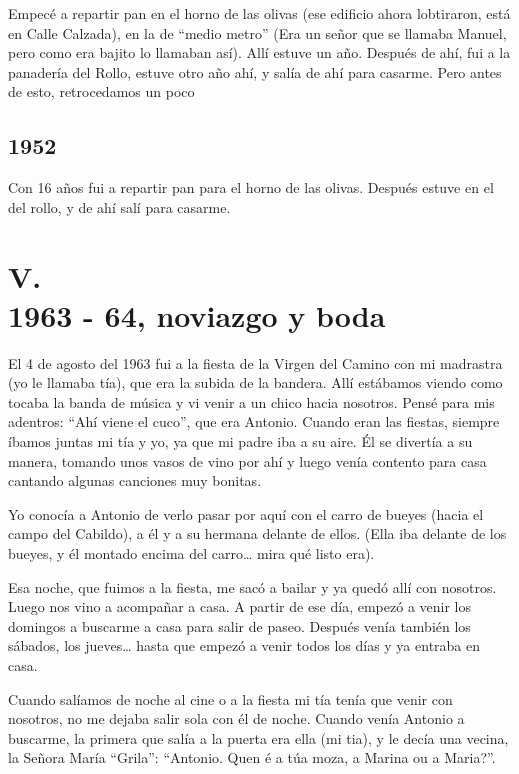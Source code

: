 \documentclass[12pt,a5paper]{book}
\begin{document}
Empecé a repartir pan en el horno de las olivas (ese edificio ahora lobtiraron, está en Calle Calzada), en la de “medio metro” (Era un señor que se llamaba Manuel, pero como era bajito lo llamaban así). Allí estuve un año. Después de ahí, fui a la panadería del Rollo, estuve otro año ahí, y salía de ahí para casarme. Pero antes de esto, retrocedamos un poco



\subsection*{1952}

Con 16 años fui a repartir pan para el horno de las olivas. Después estuve en el del rollo, y de ahí salí para casarme.



\section*{V.\\1963 - 64, noviazgo y boda}


El 4 de agosto del 1963 fui a la fiesta de la Virgen del Camino con mi madrastra (yo le llamaba tía), que era la subida de la bandera. Allí estábamos viendo como tocaba la banda de música y vi venir a un chico hacia nosotros. Pensé para mis adentros: “Ahí viene el cuco”, que era Antonio.
Cuando eran las fiestas, siempre íbamos juntas mi tía y yo, ya que mi padre iba a su aire. Él se divertía a su manera, tomando unos vasos de vino por ahí y luego venía contento para casa cantando algunas canciones muy bonitas.

Yo conocía a Antonio de verlo pasar por aquí con el carro de bueyes (hacia el campo del Cabildo), a él y a su hermana delante de ellos. (Ella iba delante de los bueyes, y él montado encima del carro… mira qué listo era).

Esa noche, que fuimos a la fiesta, me sacó a bailar y ya quedó allí con nosotros. Luego nos vino a acompañar a casa. A partir de ese día, empezó a venir los domingos a buscarme a casa para salir de paseo. Después venía también los sábados, los jueves… hasta que empezó a venir todos los días y ya entraba en casa.

Cuando salíamos de noche al cine o a la fiesta mi tía tenía que venir con nosotros, no me dejaba salir sola con él de noche. Cuando venía Antonio a buscarme, la primera que salía a la puerta era ella (mi tia), y le decía una vecina, la Señora María “Grila”: “Antonio. Quen é a túa moza, a Marina ou a Maria?”.
\end{document}

